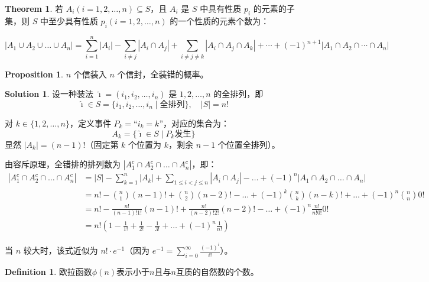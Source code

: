 \documentclass[oneside]{book}
\theoremstyle{definition}
\newtheorem{proposition}{Proposition}[section]
\newtheorem{definition}{Definition}[section]
\newtheorem{theorem}{Theorem}[section]
\newtheorem*{sol}{Solution}
\begin{document}
		\begin{theorem}
			若 \( A_i (i=1,2,\ldots,n) \subseteq S \)，且 \( A_i \) 是 \( S \) 中具有性质 \( p_i \) 的元素的子集，则 \( S \) 中至少具有性质 \( p_i (i=1,2,\ldots,n) \) 的一个性质的元素个数为：
		
		\[
		|A_1\cup A_2\cup \dots \cup A_n|=\sum_{i=1}^n |A_i| - \sum_{i \neq j} |A_i \cap A_j| + \sum_{i \neq j \neq k} |A_i \cap A_j \cap A_k| + \cdots + (-1)^{n+1} |A_1 \cap A_2 \cap \cdots \cap A_n|
		\]
		\end{theorem}
		\begin{proposition}
		\( n \) 个信装入 \( n \) 个信封，全装错的概率。
		\end{proposition}
		\begin{sol}
			设一种装法 \( \hat{\imath} = (i_1, i_2, \dots, i_n) \) 是 \( 1,2,\dots,n \) 的全排列，即
			\[
			\hat{\imath} \in S = \{i_1, i_2, \dots, i_n \mid \text{全排列}\}, \quad |S| = n!
			\]
			
			对 \( k \in \{1,2,\dots,n\} \)，定义事件 \( P_k = \text{“}i_k = k\text{”} \)，对应的集合为：
			\[
			A_k = \{\hat{\imath} \in S \mid P_k \text{发生}\}
			\]
			显然 \( |A_k| = (n-1)! \)（固定第 \( k \) 个位置为 \( k \)，剩余 \( n-1 \) 个位置全排列）。
			
			
			由容斥原理，全错排的排列数为 \( |A_1^c \cap A_2^c \cap \dots \cap A_n^c| \)，即：
			\[
			\begin{aligned}
				|A_1^c \cap A_2^c \cap \dots \cap A_n^c| &= |S| - \sum_{k=1}^n |A_k| + \sum_{1 \leq i<j \leq n} |A_i \cap A_j| - \dots + (-1)^n |A_1 \cap A_2 \cap \dots \cap A_n| \\
				&= n! - \binom{n}{1}(n-1)! + \binom{n}{2}(n-2)! - \dots + (-1)^k \binom{n}{k}(n-k)! + \dots + (-1)^n \binom{n}{n}0! \\
				&= n! - \frac{n!}{(n-1)!1!}(n-1)! + \frac{n!}{(n-2)!2!}(n-2)! - \dots + (-1)^n \frac{n!}{n!0!}0! \\
				&= n! \left( 1 - \frac{1}{1!} + \frac{1}{2!} - \frac{1}{3!} + \dots + (-1)^n \frac{1}{n!} \right)
			\end{aligned}
			\]
			
			
			当 \( n \) 较大时，该式近似为 \( n! \cdot e^{-1} \)（因为 \( e^{-1} = \sum_{i=0}^\infty \frac{(-1)^i}{i!} \)）。
		\end{sol}
		
		
		
	\begin{definition}
		欧拉函数\(\phi(n)\)表示小于\(n\)且与\(n\)互质的自然数的个数。
	\end{definition}
	
\end{document}
